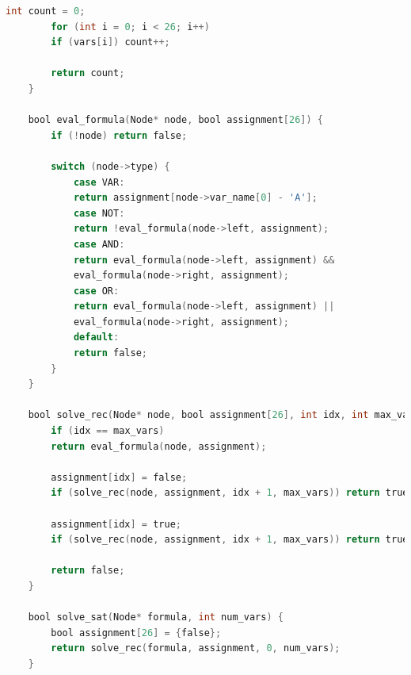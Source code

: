 \documentclass{report}
\begin{document}
\begin{lstlisting}[language=C]
		int count = 0;
		for (int i = 0; i < 26; i++)
		if (vars[i]) count++;
		
		return count;
	}

	bool eval_formula(Node* node, bool assignment[26]) {
		if (!node) return false;
		
		switch (node->type) {
			case VAR:
			return assignment[node->var_name[0] - 'A'];
			case NOT:
			return !eval_formula(node->left, assignment);
			case AND:
			return eval_formula(node->left, assignment) &&
			eval_formula(node->right, assignment);
			case OR:
			return eval_formula(node->left, assignment) ||
			eval_formula(node->right, assignment);
			default:
			return false;
		}
	}

	bool solve_rec(Node* node, bool assignment[26], int idx, int max_vars) {
		if (idx == max_vars)
		return eval_formula(node, assignment);
		
		assignment[idx] = false;
		if (solve_rec(node, assignment, idx + 1, max_vars)) return true;
		
		assignment[idx] = true;
		if (solve_rec(node, assignment, idx + 1, max_vars)) return true;
		
		return false;
	}

	bool solve_sat(Node* formula, int num_vars) {
		bool assignment[26] = {false};
		return solve_rec(formula, assignment, 0, num_vars);
	}
	
	\end{lstlisting}
	\newpage
\end{document}
